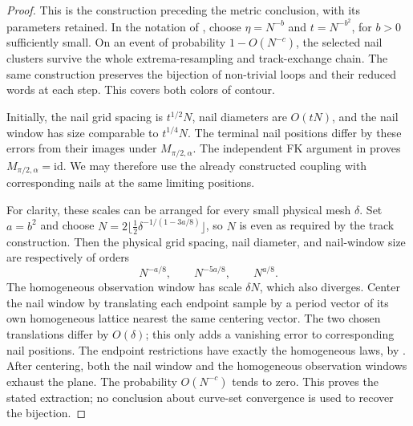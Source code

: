 \begin{proof}
This is the construction preceding the metric conclusion, with its
parameters retained.  In the notation of
\cite[Definition~3.8 and Section~3.6, pp.~49--50]{DCKKMO2026Rotation},
choose $\eta=N^{-b}$ and $t=N^{-b^2}$, for $b>0$ sufficiently small.
On an event of probability $1-O(N^{-c})$, the selected nail
clusters survive the whole extrema-resampling and track-exchange
chain.  The same construction preserves the bijection of
non-trivial loops and their reduced words at each step.
This covers both colors of contour.

Initially, the nail grid spacing is $t^{1/2}N$, nail diameters
are $O(tN)$, and the nail window has size comparable to
$t^{1/4}N$.  The terminal nail positions differ by these errors
from their images under $M_{\pi/2,\alpha}$.  The independent FK
argument in \cite[Section~4.2, proof of Theorem~1.7]{DCKKMO2026Rotation}
proves $M_{\pi/2,\alpha}=\mathrm{id}$.  We may therefore use the
already constructed coupling with corresponding nails at the same
limiting positions.

For clarity, these scales can be arranged for every small physical
mesh $\delta$.  Set $a=b^2$ and choose
$N=2\lfloor\tfrac12\delta^{-1/(1-3a/8)}\rfloor$, so $N$
is even as required by the track construction.  Then the physical grid
spacing, nail diameter, and nail-window size are respectively of
orders
\[
 N^{-a/8},\qquad N^{-5a/8},\qquad N^{a/8}.
\]
The homogeneous observation window has scale $\delta N$, which
also diverges.  Center the nail window by translating each
endpoint sample by a period vector of its own homogeneous
lattice nearest the same centering vector.  The two chosen
translations differ by $O(\delta)$; this only adds a vanishing
error to corresponding nail positions.  The endpoint restrictions
have exactly the homogeneous laws, by
\cite[Proposition~2.11]{DCKKMO2026Rotation}.  After centering, both
the nail window and the homogeneous observation windows exhaust
the plane.  The probability $O(N^{-c})$ tends to zero.  This proves
the stated extraction; no conclusion about curve-set convergence
is used to recover the bijection.
\end{proof}

